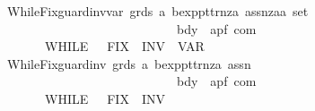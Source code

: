 \begin{isabellebody}
\ \ {\isachardoublequoteopen}{\isacharunderscore}WhileFix{\isacharunderscore}guard{\isacharunderscore}inv{\isacharunderscore}var{\isachardoublequoteclose}{\isacharcolon}{\isacharcolon}\ {\isachardoublequoteopen}grds\ {\isasymRightarrow}{\isacharprime}a\ bexp{\isasymRightarrow}pttrn{\isasymRightarrow}{\isacharparenleft}{\isacharprime}z{\isasymRightarrow}{\isacharprime}a\ assn{\isacharparenright}{\isasymRightarrow}{\isacharparenleft}{\isacharprime}z{\isasymRightarrow}{\isacharparenleft}{\isacharprime}a{\isasymtimes}{\isacharprime}a{\isacharparenright}\ set{\isacharparenright}\isanewline
\ \ \ \ \ \ \ \ \ \ \ \ \ \ \ \ \ \ \ \ \ \ \ \ \ \ \ \ \ {\isasymRightarrow}bdy\ {\isasymRightarrow}\ {\isacharparenleft}{\isacharprime}a{\isacharcomma}{\isacharprime}p{\isacharcomma}{\isacharprime}f{\isacharparenright}\ com{\isachardoublequoteclose}\isanewline
\ \ \ \ \ \ \ \ {\isacharparenleft}{\isachardoublequoteopen}{\isacharparenleft}{}WHILE\ {\isacharparenleft}{\isacharunderscore}{\isacharslash}{\isasymlongmapsto}\ {\isacharparenleft}{}{\isacharunderscore}{\isacharparenright}{\isacharparenright}\ FIX\ {\isacharunderscore}{\isachardot}{\isacharslash}\ INV\ {\isacharparenleft}{\isacharunderscore}{\isacharparenright}{\isacharslash}\ VAR\ {\isacharparenleft}{\isacharunderscore}{\isacharparenright}\ {\isacharslash}{\isacharunderscore}{\isacharparenright}{\isachardoublequoteclose}\ \ {\isacharbrackleft}{}{}{}{}{\isacharcomma}{}{}{\isacharcomma}{}{\isacharcomma}{}{\isacharcomma}{}{\isacharcomma}{}{}{\isacharbrackright}\ {}{}{\isacharparenright}\isanewline
\ \ {\isachardoublequoteopen}{\isacharunderscore}WhileFix{\isacharunderscore}guard{\isacharunderscore}inv{\isachardoublequoteclose}{\isacharcolon}{\isacharcolon}\ {\isachardoublequoteopen}grds\ {\isasymRightarrow}{\isacharprime}a\ bexp{\isasymRightarrow}pttrn{\isasymRightarrow}{\isacharparenleft}{\isacharprime}z{\isasymRightarrow}{\isacharprime}a\ assn{\isacharparenright}\isanewline
\ \ \ \ \ \ \ \ \ \ \ \ \ \ \ \ \ \ \ \ \ \ \ \ \ \ \ \ \ {\isasymRightarrow}bdy\ {\isasymRightarrow}\ {\isacharparenleft}{\isacharprime}a{\isacharcomma}{\isacharprime}p{\isacharcomma}{\isacharprime}f{\isacharparenright}\ com{\isachardoublequoteclose}\isanewline
\ \ \ \ \ \ \ \ {\isacharparenleft}{\isachardoublequoteopen}{\isacharparenleft}{}WHILE\ {\isacharparenleft}{\isacharunderscore}{\isacharslash}{\isasymlongmapsto}\ {\isacharparenleft}{}{\isacharunderscore}{\isacharparenright}{\isacharparenright}\ FIX\ {\isacharunderscore}{\isachardot}{\isacharslash}\ INV\ {\isacharparenleft}{\isacharunderscore}{\isacharparenright}{\isacharslash}{\isacharunderscore}{\isacharparenright}{\isachardoublequoteclose}\ \ {\isacharbrackleft}{}{}{}{}{\isacharcomma}{}{}{\isacharcomma}{}{\isacharcomma}{}{\isacharcomma}{}{}{\isacharbrackright}\ {}{}{\isacharparenright}\isanewline

\end{isabellebody}
